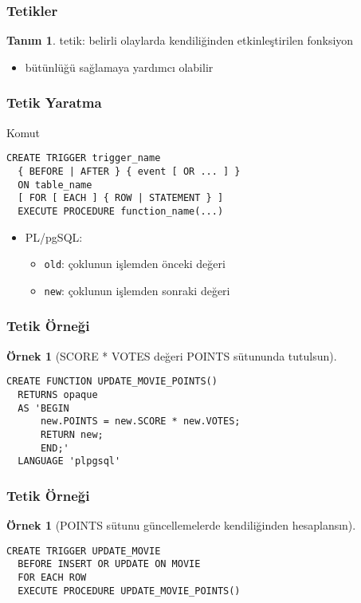 \documentclass[dvipsnames]{beamer}
\theoremstyle{definition}
\newtheorem{tanim}[theorem]{Tanım}
\theoremstyle{example}
\newtheorem{ornek}[theorem]{Örnek}
\theoremstyle{plain}
\begin{document}
\begin{frame}
  \frametitle{Tetikler}

  \begin{tanim}
    \alert{tetik}: belirli olaylarda kendiliğinden etkinleştirilen fonksiyon
  \end{tanim}

  \begin{itemize}
    \item bütünlüğü sağlamaya yardımcı olabilir
  \end{itemize}
\end{frame}

\begin{frame}[fragile]
  \frametitle{Tetik Yaratma}

  \begin{block}{Komut}
    \begin{lstlisting}
CREATE TRIGGER trigger_name
  { BEFORE | AFTER } { event [ OR ... ] }
  ON table_name
  [ FOR [ EACH ] { ROW | STATEMENT } ]
  EXECUTE PROCEDURE function_name(...)
    \end{lstlisting}
  \end{block}

  \begin{itemize}
    \item PL/pgSQL:
    \begin{itemize}
      \item \lstinline!old!: çoklunun işlemden önceki değeri
      \item \lstinline!new!: çoklunun işlemden sonraki değeri
    \end{itemize}
  \end{itemize}
\end{frame}

\begin{frame}[fragile]
  \frametitle{Tetik Örneği}

  \begin{ornek}[SCORE * VOTES değeri POINTS sütununda tutulsun]
    \begin{lstlisting}
CREATE FUNCTION UPDATE_MOVIE_POINTS()
  RETURNS opaque
  AS 'BEGIN
      new.POINTS = new.SCORE * new.VOTES;
      RETURN new;
      END;'
  LANGUAGE 'plpgsql'
    \end{lstlisting}
  \end{ornek}
\end{frame}

\begin{frame}[fragile]
  \frametitle{Tetik Örneği}

  \begin{ornek}[POINTS sütunu güncellemelerde kendiliğinden hesaplansın]
    \begin{lstlisting}
CREATE TRIGGER UPDATE_MOVIE
  BEFORE INSERT OR UPDATE ON MOVIE
  FOR EACH ROW
  EXECUTE PROCEDURE UPDATE_MOVIE_POINTS()
    \end{lstlisting}
  \end{ornek}
\end{frame}
\end{document}
